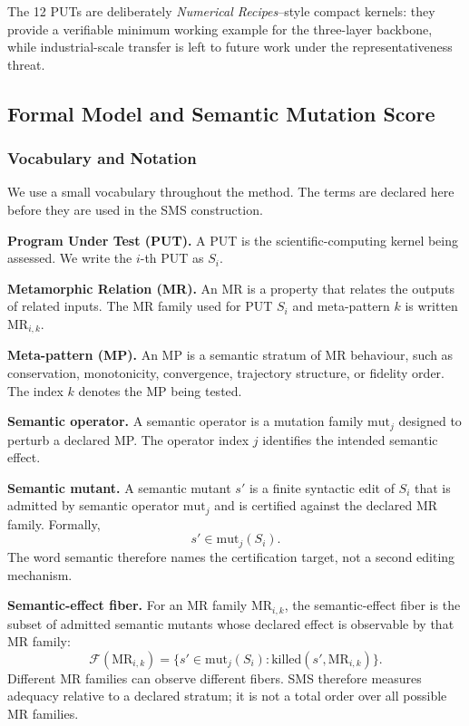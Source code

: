 \documentclass[manuscript,screen,review]{acmart}
\begin{document}
The 12 PUTs are deliberately \emph{Numerical Recipes}--style compact
kernels: they provide a verifiable minimum working example for the
three-layer backbone, while industrial-scale transfer is left to future
work under the representativeness threat.


\subsection{Formal Model and Semantic Mutation Score}\label{notation-and-equivalence-judgement}

\subsubsection{Vocabulary and Notation}\label{vocabulary-inheritance}

We use a small vocabulary throughout the method. The terms are declared
here before they are used in the SMS construction.

\textbf{Program Under Test (PUT).} A PUT is the scientific-computing
kernel being assessed. We write the \(i\)-th PUT as \(S_i\).

\textbf{Metamorphic Relation (MR).} An MR is a property that relates the
outputs of related inputs. The MR family used for PUT \(S_i\) and
meta-pattern \(k\) is written \(\mathrm{MR}_{i,k}\).

\textbf{Meta-pattern (MP).} An MP is a semantic stratum of MR behaviour,
such as conservation, monotonicity, convergence, trajectory structure, or
fidelity order. The index \(k\) denotes the MP being tested.

\textbf{Semantic operator.} A semantic operator is a mutation family
\(\mathrm{mut}_j\) designed to perturb a declared MP. The operator index
\(j\) identifies the intended semantic effect.

\textbf{Semantic mutant.} A semantic mutant \(s'\) is a finite syntactic
edit of \(S_i\) that is admitted by semantic operator \(\mathrm{mut}_j\)
and is certified against the declared MR family. Formally,
\[
  s' \in \mathrm{mut}_j(S_i).
\]
The word semantic therefore names the certification target, not a second
editing mechanism.

\textbf{Semantic-effect fiber.} For an MR family \(\mathrm{MR}_{i,k}\),
the semantic-effect fiber is the subset of admitted semantic mutants
whose declared effect is observable by that MR family:
\[
  \mathcal{F}(\mathrm{MR}_{i,k}) =
  \{s' \in \mathrm{mut}_j(S_i): \mathrm{killed}(s', \mathrm{MR}_{i,k})\}.
\]
Different MR families can observe different fibers. SMS therefore
measures adequacy relative to a declared stratum; it is not a total order
over all possible MR families.
\end{document}
